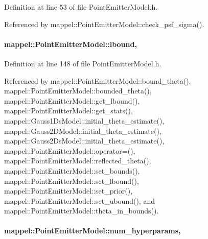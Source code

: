 Definition at line 53 of file Point\+Emitter\+Model.\+h.



Referenced by mappel\+::\+Point\+Emitter\+Model\+::check\+\_\+psf\+\_\+sigma().

\paragraph[{\texorpdfstring{lbound}{lbound}}]{ mappel\+::\+Point\+Emitter\+Model\+::lbound\hspace{0.3cm}{\ttfamily [protected]}, {\ttfamily [inherited]}}\hypertarget{classmappel_1_1PointEmitterModel_a889bc82f74cfa654da121e5770296ab2}{}\label{classmappel_1_1PointEmitterModel_a889bc82f74cfa654da121e5770296ab2}


Definition at line 148 of file Point\+Emitter\+Model.\+h.



Referenced by mappel\+::\+Point\+Emitter\+Model\+::bound\+\_\+theta(), mappel\+::\+Point\+Emitter\+Model\+::bounded\+\_\+theta(), mappel\+::\+Point\+Emitter\+Model\+::get\+\_\+lbound(), mappel\+::\+Point\+Emitter\+Model\+::get\+\_\+stats(), mappel\+::\+Gauss1\+Ds\+Model\+::initial\+\_\+theta\+\_\+estimate(), mappel\+::\+Gauss2\+D\+Model\+::initial\+\_\+theta\+\_\+estimate(), mappel\+::\+Gauss2\+Ds\+Model\+::initial\+\_\+theta\+\_\+estimate(), mappel\+::\+Point\+Emitter\+Model\+::operator=(), mappel\+::\+Point\+Emitter\+Model\+::reflected\+\_\+theta(), mappel\+::\+Point\+Emitter\+Model\+::set\+\_\+bounds(), mappel\+::\+Point\+Emitter\+Model\+::set\+\_\+lbound(), mappel\+::\+Point\+Emitter\+Model\+::set\+\_\+prior(), mappel\+::\+Point\+Emitter\+Model\+::set\+\_\+ubound(), and mappel\+::\+Point\+Emitter\+Model\+::theta\+\_\+in\+\_\+bounds().

\paragraph[{\texorpdfstring{num\+\_\+hyperparams}{num_hyperparams}}]{ mappel\+::\+Point\+Emitter\+Model\+::num\+\_\+hyperparams\hspace{0.3cm}{\ttfamily [protected]}, {\ttfamily [inherited]}}\hypertarget{classmappel_1_1PointEmitterModel_ab2423214fdd81c8212118770b5b17b1f}{}\label{classmappel_1_1PointEmitterModel_ab2423214fdd81c8212118770b5b17b1f}



